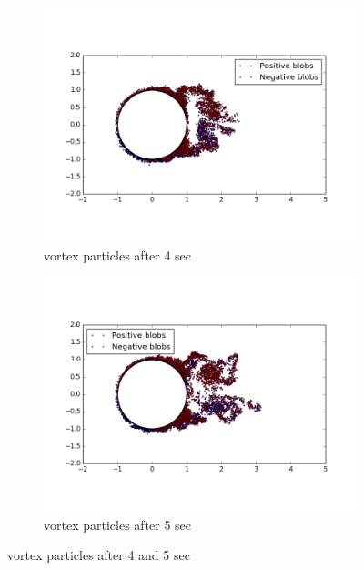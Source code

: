 \documentclass[a4paper,11pt]{article}
\begin{document}
\begin{figure}[ht]
	\centering
	\begin{subfigure}[ht]{.5\textwidth}
  		\centering
  		\includegraphics[width=.8\linewidth]{rb_4.png}
  		\caption{vortex particles after 4 sec}
  		\label{fig:36}
	\end{subfigure}
	\begin{subfigure}[ht]{.5\textwidth}
  		\centering
  		\includegraphics[width=.8\linewidth]{rb_5.png}
  		\caption{vortex particles after 5 sec}
  		\label{fig:49}
	\end{subfigure}%
	\label{fig:Question 1a}
  \caption{vortex particles after 4 and 5 sec}
\end{figure}
\end{document}
